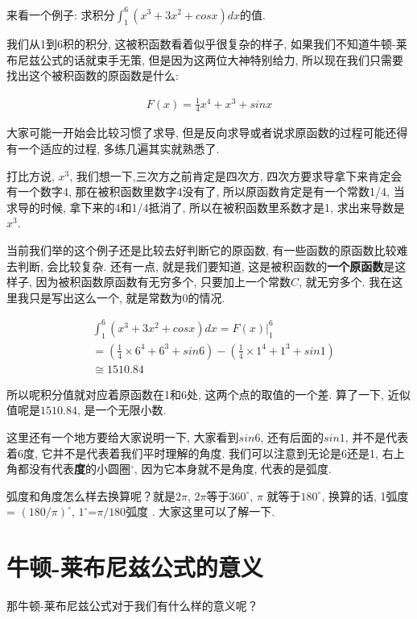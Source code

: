 来看一个例子: 求积分$\int_1^6(x^3 + 3x^2+cos x)dx$的值. 

我们从1到6积的积分, 这被积函数看着似乎很复杂的样子, 如果我们不知道牛顿-莱布尼兹公式的话就束手无策, 但是因为这两位大神特别给力, 所以现在我们只需要找出这个被积函数的原函数是什么: 

\begin{align*}
  F(x) = \frac{1}{4}x^4 + x^3 + sinx
\end{align*}

大家可能一开始会比较习惯了求导, 但是反向求导或者说求原函数的过程可能还得有一个适应的过程, 多练几遍其实就熟悉了. 

打比方说,  $x^3$, 我们想一下,三次方之前肯定是四次方, 四次方要求导拿下来肯定会有一个数字4, 那在被积函数里数字4没有了, 所以原函数肯定是有一个常数1/4, 当求导的时候, 拿下来的4和1/4抵消了, 所以在被积函数里系数才是1, 求出来导数是$x^3$. 

当前我们举的这个例子还是比较去好判断它的原函数, 有一些函数的原函数比较难去判断, 会比较复杂. 还有一点, 就是我们要知道, 这是被积函数的\textbf{一个原函数}是这样子, 因为被积函数原函数有无穷多个, 只要加上一个常数$C$, 就无穷多个. 我在这里我只是写出这么一个, 就是常数为0的情况. 

\begin{align*}
  & \int_1^6(x^3 + 3x^2+cosx)dx = F(x)\vert_1^6 \\
  & = (\frac{1}{4}\times 6^4 + 6^3 +sin6) - (\frac{1}{4} \times 1^4 + 1^3 + sin1) \\
  & \cong 1510.84
\end{align*}

所以呢积分值就对应着原函数在1和6处, 这两个点的取值的一个差. 算了一下, 近似值呢是$1510.84$, 是一个无限小数. 

这里还有一个地方要给大家说明一下, 大家看到$sin6$, 还有后面的$sin1$, 并不是代表着6度, 它并不是代表着我们平时理解的角度. 我们可以注意到无论是6还是1, 右上角都没有代表\textbf{度}的小圆圈\textbf{$^\circ$}, 因为它本身就不是角度, 代表的是弧度. 

弧度和角度怎么样去换算呢？就是$2\pi$, $2\pi$等于$360^\circ$, $\pi$ 就等于$180^\circ$, 换算的话, 1弧度 = $(180 / \pi)^\circ$,  $1^\circ$=$\pi / 180\mbox{弧度}$ . 大家这里可以了解一下. 

\section{牛顿-莱布尼兹公式的意义}

那牛顿-莱布尼兹公式对于我们有什么样的意义呢？

